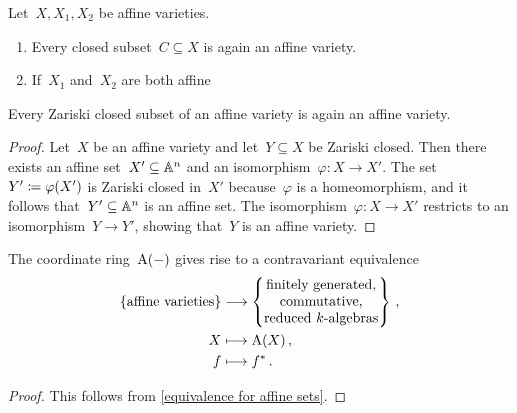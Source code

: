 \begin{lemma}
  Let~$X, X_1, X_2$ be affine varieties.
  \begin{enumerate}
    \item
      Every closed subset~$C \subseteq X$ is again an affine variety.
    \item
      If~$X_1$ and~$X_2$ are both affine 
  \end{enumerate}
\end{lemma}


\begin{lemma}
  \label{closed of affine is again affine}
  Every Zariski closed subset of an affine variety is again an affine variety.
\end{lemma}


\begin{proof}
  Let~$X$ be an affine variety and let~$Y \subseteq X$ be Zariski closed.
  Then there exists an affine set~$X' \subseteq \mathbb{A}^n$ and an isomorphism~$\varphi \colon X \to X'$.
  The set~$Y' \coloneqq \varphi(X')$ is Zariski closed in~$X'$ because~$\varphi$ is a homeomorphism, and it follows that~$Y' \subseteq \mathbb{A}^n$ is an affine set.
  The isomorphism~$\varphi \colon X \to X'$ restricts to an isomorphism~$Y \to Y'$, showing that~$Y$ is an affine variety.
\end{proof}


\begin{lemma}
  \label{equivalence for affine varieties}
  The coordinate ring~$\operatorname{A}(-)$ gives rise to a contravariant equivalence
  \begin{align*}
    \{
      \text{affine varieties}
    \}
    &\longto
    \left\{
      \begin{tabular}{@{}c@{}}
        finitely generated, \\
        commutative,        \\
        reduced~\dash{$k$}{algebras}
      \end{tabular}
    \right\} \,,
    \\
    X
    &\longmapsto
    \coord(X) \,,
    \\
    f
    &\longmapsto
    f^* \,.
  \end{align*}
\end{lemma}


\begin{proof}
  This follows from \cref{equivalence for affine sets}.
\end{proof}




